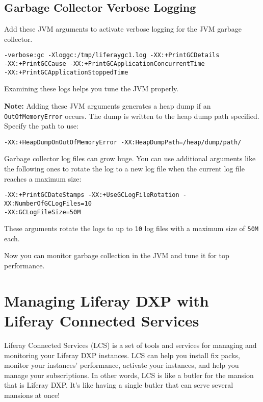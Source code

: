 \section{Garbage Collector Verbose
Logging}\label{garbage-collector-verbose-logging}

Add these JVM arguments to activate verbose logging for the JVM garbage
collector.

\begin{verbatim}
-verbose:gc -Xloggc:/tmp/liferaygc1.log -XX:+PrintGCDetails 
-XX:+PrintGCCause -XX:+PrintGCApplicationConcurrentTime 
-XX:+PrintGCApplicationStoppedTime
\end{verbatim}

Examining these logs helps you tune the JVM properly.

\noindent\hrulefill

\textbf{Note:} Adding these JVM arguments generates a heap dump if an
\texttt{OutOfMemoryError} occurs. The dump is written to the heap dump
path specified. Specify the path to use:

\texttt{-XX:+HeapDumpOnOutOfMemoryError\ -XX:HeapDumpPath=/heap/dump/path/}

\noindent\hrulefill

Garbage collector log files can grow huge. You can use additional
arguments like the following ones to rotate the log to a new log file
when the current log file reaches a maximum size:

\begin{verbatim}
-XX:+PrintGCDateStamps -XX:+UseGCLogFileRotation -XX:NumberOfGCLogFiles=10 
-XX:GCLogFileSize=50M
\end{verbatim}

These arguments rotate the logs to up to \texttt{10} log files with a
maximum size of \texttt{50M} each.

Now you can monitor garbage collection in the JVM and tune it for top
performance.

\chapter{Managing Liferay DXP with Liferay Connected
Services}\label{managing-liferay-dxp-with-liferay-connected-services}

Liferay Connected Services (LCS) is a set of tools and services for
managing and monitoring your Liferay DXP instances. LCS can help you
install fix packs, monitor your instances' performance, activate your
instances, and help you manage your subscriptions. In other words, LCS
is like a butler for the mansion that is Liferay DXP. It's like having a
single butler that can serve several mansions at once!

